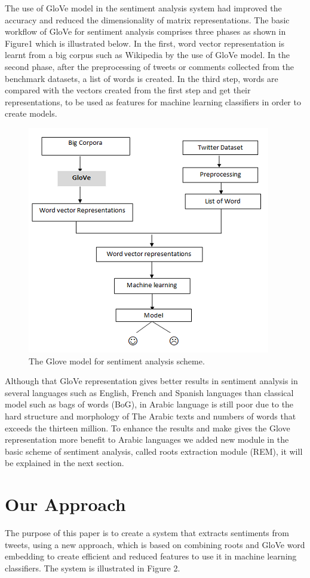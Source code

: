 \documentclass[conference]{IEEEtran}
\begin{document}
	The use of GloVe model in the sentiment analysis system had improved the accuracy and reduced the dimensionality of matrix representations. The basic workflow of GloVe for sentiment analysis comprises three phases as shown in Figure1 which is illustrated below. In the first, word vector representation is learnt from a big corpus such as Wikipedia by the use of GloVe model. In the second phase, after the preprocessing of tweets or comments collected from the benchmark datasets, a list of words is created. In the third step, words are compared with the vectors created from the first step and get their representations, to be used as features for machine learning classifiers in order to create models.
	\begin{figure}[htbp]
		\centerline{\includegraphics[scale=0.9]{GloveSA.png}}
		\caption{The Glove model for sentiment analysis scheme.}
		\label{fig}
	\end{figure}
	Although that GloVe representation gives better results in sentiment analysis in several languages such as English, French and Spanish languages than classical model such as bags of words (BoG), in Arabic language is still poor due to the hard structure and morphology of The Arabic texts and numbers of words that exceeds the thirteen million. To enhance the results and make gives the Glove representation more benefit to Arabic languages we added new module in the basic scheme of sentiment analysis, called roots extraction module (REM), it will be explained in the next section.
	
	\section{Our Approach}
	The purpose of this paper is to create a system that extracts sentiments from tweets, using a new approach, which is based on combining roots and GloVe word embedding to create efficient and reduced features to use it in machine learning classifiers. The system is illustrated in Figure 2.
	
\end{document}
